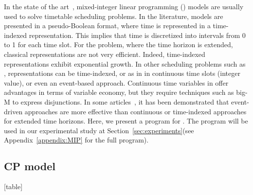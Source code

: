 \documentclass[runningheads]{llncs}
\begin{document}
In the state of the art~\cite{2014_sorensen_cor,2014_sorensen_JOS}, mixed-integer linear programming (\MIP{}) models are usually used to solve timetable scheduling problems. 
In the literature, \MIP{} models are presented in a pseudo-Boolean format, where time is represented in a time-indexed representation. 
This implies that time is discretized into intervals from 0 to 1 for each time slot. 
For the \UTP{} problem, where the time horizon is extended, classical representations are not very efficient. 
Indeed, time-indexed representations exhibit exponential growth. 
In other scheduling problems such as \RCPCSP{}, representations can be time-indexed, or as in \CP{} in continuous time slots (integer value), or even an event-based approach. 
Continuous time variables in \MIP{} offer advantages in terms of variable economy, but they require techniques such as big-M to express disjunctions. In some articles~\cite{2011_kone_COR}, it has been demonstrated that event-driven approaches are more effective than continuous or time-indexed approaches for extended time horizons. Here, we present a \MIP{} program for \UTP{}. 
The program will be used in our experimental study at Section~\ref{sec:experiments}(see Appendix~\ref{appendix:MIP} for the full program). 


























  \subsection{CP model}\label{appendix:CP}
\vspace{-0.6cm}
[table]
\renewcommand{\therowcntr}{(\arabic{rowcntr})}
\setcounter{rowcntr}{0}
\end{document}
